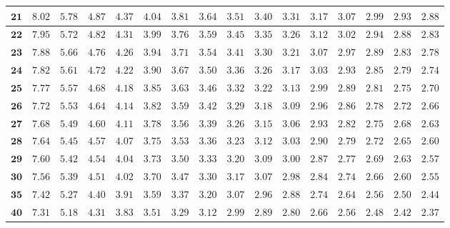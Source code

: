 \begin{longtable}{|r|r|r|r|r|r|r|r|r|r|r|r|r|r|r|r|}
    \(\mathbf{21}\) & \(8.02\) & \(5.78\) & \(4.87\) & \(4.37\) & \(4.04\) & \(3.81\) & \(3.64\) & \(3.51\) & \(3.40\) & \(3.31\) & \(3.17\) & \(3.07\) & \(2.99\) & \(2.93\) & \(2.88\) \\ \hline 
    \(\mathbf{22}\) & \(7.95\) & \(5.72\) & \(4.82\) & \(4.31\) & \(3.99\) & \(3.76\) & \(3.59\) & \(3.45\) & \(3.35\) & \(3.26\) & \(3.12\) & \(3.02\) & \(2.94\) & \(2.88\) & \(2.83\) \\ \hline 
    \(\mathbf{23}\) & \(7.88\) & \(5.66\) & \(4.76\) & \(4.26\) & \(3.94\) & \(3.71\) & \(3.54\) & \(3.41\) & \(3.30\) & \(3.21\) & \(3.07\) & \(2.97\) & \(2.89\) & \(2.83\) & \(2.78\) \\ \hline 
    \(\mathbf{24}\) & \(7.82\) & \(5.61\) & \(4.72\) & \(4.22\) & \(3.90\) & \(3.67\) & \(3.50\) & \(3.36\) & \(3.26\) & \(3.17\) & \(3.03\) & \(2.93\) & \(2.85\) & \(2.79\) & \(2.74\) \\ \hline 
    \(\mathbf{25}\) & \(7.77\) & \(5.57\) & \(4.68\) & \(4.18\) & \(3.85\) & \(3.63\) & \(3.46\) & \(3.32\) & \(3.22\) & \(3.13\) & \(2.99\) & \(2.89\) & \(2.81\) & \(2.75\) & \(2.70\) \\ \hline 
    \(\mathbf{26}\) & \(7.72\) & \(5.53\) & \(4.64\) & \(4.14\) & \(3.82\) & \(3.59\) & \(3.42\) & \(3.29\) & \(3.18\) & \(3.09\) & \(2.96\) & \(2.86\) & \(2.78\) & \(2.72\) & \(2.66\) \\ \hline 
    \(\mathbf{27}\) & \(7.68\) & \(5.49\) & \(4.60\) & \(4.11\) & \(3.78\) & \(3.56\) & \(3.39\) & \(3.26\) & \(3.15\) & \(3.06\) & \(2.93\) & \(2.82\) & \(2.75\) & \(2.68\) & \(2.63\) \\ \hline 
    \(\mathbf{28}\) & \(7.64\) & \(5.45\) & \(4.57\) & \(4.07\) & \(3.75\) & \(3.53\) & \(3.36\) & \(3.23\) & \(3.12\) & \(3.03\) & \(2.90\) & \(2.79\) & \(2.72\) & \(2.65\) & \(2.60\) \\ \hline 
    \(\mathbf{29}\) & \(7.60\) & \(5.42\) & \(4.54\) & \(4.04\) & \(3.73\) & \(3.50\) & \(3.33\) & \(3.20\) & \(3.09\) & \(3.00\) & \(2.87\) & \(2.77\) & \(2.69\) & \(2.63\) & \(2.57\) \\ \hline 
    \(\mathbf{30}\) & \(7.56\) & \(5.39\) & \(4.51\) & \(4.02\) & \(3.70\) & \(3.47\) & \(3.30\) & \(3.17\) & \(3.07\) & \(2.98\) & \(2.84\) & \(2.74\) & \(2.66\) & \(2.60\) & \(2.55\) \\ \hline 
    \(\mathbf{35}\) & \(7.42\) & \(5.27\) & \(4.40\) & \(3.91\) & \(3.59\) & \(3.37\) & \(3.20\) & \(3.07\) & \(2.96\) & \(2.88\) & \(2.74\) & \(2.64\) & \(2.56\) & \(2.50\) & \(2.44\) \\ \hline 
    \(\mathbf{40}\) & \(7.31\) & \(5.18\) & \(4.31\) & \(3.83\) & \(3.51\) & \(3.29\) & \(3.12\) & \(2.99\) & \(2.89\) & \(2.80\) & \(2.66\) & \(2.56\) & \(2.48\) & \(2.42\) & \(2.37\) \\ \hline 

\end{longtable}
